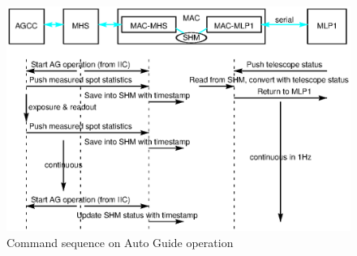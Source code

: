 \documentclass[a4paper,notitlepage]{article}
\begin{document}
\begin{figure}[htb]
  \begin{center}
    \includegraphics{ag_autoguide_sequence.eps}
  \end{center}
  \caption{Command sequence on Auto Guide operation}
  \label{fig:autoguide_sequence}
\end{figure}
\end{document}
